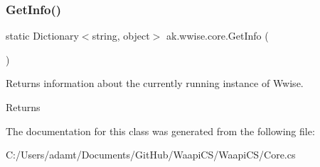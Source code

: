 \subsubsection{\texorpdfstring{Get\+Info()}{GetInfo()}}
{\footnotesize\ttfamily static Dictionary$<$string, object$>$ ak.\+wwise.\+core.\+Get\+Info (\begin{DoxyParamCaption}{ }\end{DoxyParamCaption})\hspace{0.3cm}{\ttfamily [static]}}



Returns information about the currently running instance of Wwise. 

\begin{DoxyReturn}{Returns}

\end{DoxyReturn}


The documentation for this class was generated from the following file\+:\begin{DoxyCompactItemize}
\item 
C\+:/\+Users/adamt/\+Documents/\+Git\+Hub/\+Waapi\+C\+S/\+Waapi\+C\+S/Core.\+cs\end{DoxyCompactItemize}

